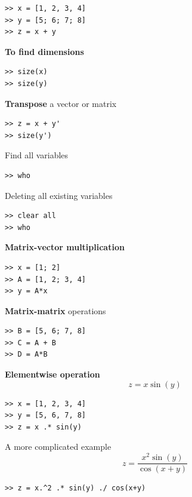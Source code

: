 \documentclass[11pt,xcolor=svgnames,onlymath]{beamer}
\begin{document}
\begin{frame}
\begin{lstlisting}
>> x = [1, 2, 3, 4]
>> y = [5; 6; 7; 8]
>> z = x + y
\end{lstlisting}

\vspace{2mm}

{\bf To find dimensions}
\begin{lstlisting}
>> size(x)
>> size(y)
\end{lstlisting}

\vspace{2mm}

{\bf Transpose} a vector or matrix
\begin{lstlisting}
>> z = x + y'
>> size(y')
\end{lstlisting}

\vspace{2mm}

Find all variables
\begin{lstlisting}
>> who
\end{lstlisting}

\vspace{2mm}

Deleting all existing variables
\begin{lstlisting}
>> clear all
>> who
\end{lstlisting}

\pagebreak

{\bf Matrix-vector multiplication}
\begin{lstlisting}
>> x = [1; 2]
>> A = [1, 2; 3, 4]
>> y = A*x
\end{lstlisting}

\vspace{2mm}

{\bf Matrix-matrix} operations
\begin{lstlisting}
>> B = [5, 6; 7, 8]
>> C = A + B
>> D = A*B
\end{lstlisting}

\vspace{2mm}

{\bf Elementwise operation}
\[
z = x \sin(y)
\]
\begin{lstlisting}
>> x = [1, 2, 3, 4]
>> y = [5, 6, 7, 8]
>> z = x .* sin(y)
\end{lstlisting}

A more complicated example
\[
z = \frac{x^2 \sin(y)}{\cos(x+y)}
\]

\begin{lstlisting}
>> z = x.^2 .* sin(y) ./ cos(x+y)
\end{lstlisting}


\end{frame}
\end{document}

